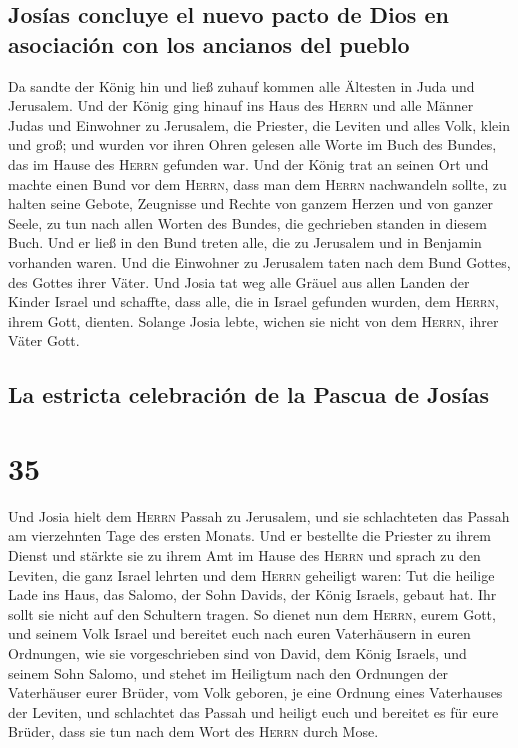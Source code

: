 \hypertarget{josuxedas-concluye-el-nuevo-pacto-de-dios-en-asociaciuxf3n-con-los-ancianos-del-pueblo}{%
\subsection{Josías concluye el nuevo pacto de Dios en asociación con los
ancianos del
pueblo}\label{josuxedas-concluye-el-nuevo-pacto-de-dios-en-asociaciuxf3n-con-los-ancianos-del-pueblo}}

 Da sandte der König hin und ließ zuhauf kommen alle
Ältesten in Juda und Jerusalem.  Und der König ging
hinauf ins Haus des \textsc{Herrn} und alle Männer Judas und Einwohner
zu Jerusalem, die Priester, die Leviten und alles Volk, klein und groß;
und wurden vor ihren Ohren gelesen alle Worte im Buch des Bundes, das im
Hause des \textsc{Herrn} gefunden war.  Und der König
trat an seinen Ort und machte einen Bund vor dem \textsc{Herrn}, dass
man dem \textsc{Herrn} nachwandeln sollte, zu halten seine Gebote,
Zeugnisse und Rechte von ganzem Herzen und von ganzer Seele, zu tun nach
allen Worten des Bundes, die gechrieben standen in diesem Buch.
 Und er ließ in den Bund treten alle, die zu Jerusalem
und in Benjamin vorhanden waren. Und die Einwohner zu Jerusalem taten
nach dem Bund Gottes, des Gottes ihrer Väter.  Und Josia
tat weg alle Gräuel aus allen Landen der Kinder Israel und schaffte,
dass alle, die in Israel gefunden wurden, dem \textsc{Herrn}, ihrem
Gott, dienten. Solange Josia lebte, wichen sie nicht von dem
\textsc{Herrn}, ihrer Väter Gott.

\hypertarget{la-estricta-celebraciuxf3n-de-la-pascua-de-josuxedas}{%
\subsection{La estricta celebración de la Pascua de
Josías}\label{la-estricta-celebraciuxf3n-de-la-pascua-de-josuxedas}}

\hypertarget{section-34}{%
\section{35}\label{section-34}}

 Und Josia hielt dem \textsc{Herrn} Passah zu Jerusalem,
und sie schlachteten das Passah am vierzehnten Tage des ersten Monats.
 Und er bestellte die Priester zu ihrem Dienst und stärkte
sie zu ihrem Amt im Hause des \textsc{Herrn}  und sprach
zu den Leviten, die ganz Israel lehrten und dem \textsc{Herrn} geheiligt
waren: Tut die heilige Lade ins Haus, das Salomo, der Sohn Davids, der
König Israels, gebaut hat. Ihr sollt sie nicht auf den Schultern tragen.
So dienet nun dem \textsc{Herrn}, eurem Gott, und seinem Volk Israel
 und bereitet euch nach euren Vaterhäusern in euren
Ordnungen, wie sie vorgeschrieben sind von David, dem König Israels, und
seinem Sohn Salomo,  und stehet im Heiligtum nach den
Ordnungen der Vaterhäuser eurer Brüder, vom Volk geboren, je eine
Ordnung eines Vaterhauses der Leviten,  und schlachtet das
Passah und heiligt euch und bereitet es für eure Brüder, dass sie tun
nach dem Wort des \textsc{Herrn} durch Mose.

